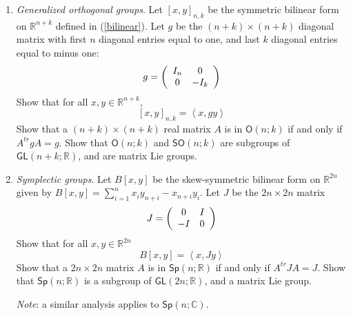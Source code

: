 \documentclass{amsbook}
\theoremstyle{plain}
\numberwithin{equation}{chapter}
\numberwithin{theorem}{chapter}
\begin{document}
\begin{enumerate}
\item \label{generalized}\textit{Generalized orthogonal groups}. Let $\left[
x,y\right]  _{n,k}$ be the symmetric bilinear form on $\mathbb{R}^{n+k}$
defined in (\ref{bilinear}). Let $g$ be the $(n+k)\times(n+k)$ diagonal matrix
with first $n$ diagonal entries equal to one, and last $k$ diagonal entries
equal to minus one:
\[
g=\left(
\begin{array}
[c]{cc}%
I_{n} & 0\\
0 & -I_{k}%
\end{array}
\right)
\]
Show that for all $x,y\in\mathbb{R}^{n+k}$,
\[
\left[  x,y\right]  _{n,k}=\left\langle x,gy\right\rangle
\]
Show that a $(n+k)\times(n+k)$ real matrix $A$ is in $\mathsf{O}(n;k)$ if and
only if $A^{tr}gA=g$. Show that $\mathsf{O}(n;k)$ and $\mathsf{SO}(n;k)$ are
subgroups of $\mathsf{GL}(n+k;\mathbb{R})$, and are matrix Lie groups.

\item \label{symplectic}\textit{Symplectic groups}. Let $B\left[  x,y\right]
$ be the skew-symmetric bilinear form on $\mathbb{R}^{2n}$ given by $B\left[
x,y\right]  =\sum_{i=1}^{n}x_{i}y_{n+i}-x_{n+i}y_{i}$. Let $J$ be the
$2n\times2n$ matrix
\[
J=\left(
\begin{array}
[c]{cc}%
0 & I\\
-I & 0
\end{array}
\right)
\]
Show that for all $x,y\in\mathbb{R}^{2n}$%
\[
B\left[  x,y\right]  =\left\langle x,Jy\right\rangle
\]
Show that a $2n\times2n$ matrix $A$ is in $\mathsf{Sp}\left(  n;\mathbb{R}%
\right)  $ if and only if $A^{tr}JA=J$. Show that $\mathsf{Sp}\left(
n;\mathbb{R}\right)  $ is a subgroup of $\mathsf{GL}(2n;\mathbb{R})$, and a
matrix Lie group.

\textit{Note}: a similar analysis applies to $\mathsf{Sp}\left(
n;\mathbb{C}\right)  $.


\end{enumerate}
\end{document}
